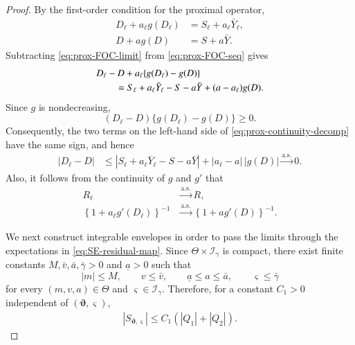\documentclass[12pt,reqno]{amsart}
\newcommand{\as}{\overset{\mathrm{a.s.}}{\longrightarrow}}
\begin{document}
{\begin{proof}
By the first-order condition for the proximal operator,
\begin{align}
D_\ell+a_\ell g(D_\ell)
&=
S_\ell+a_\ell\bar Y_\ell,
\label{eq:prox-FOC-seq}\\
D+a g(D)
&=
S+a\bar Y.
\label{eq:prox-FOC-limit}
\end{align}
Subtracting \eqref{eq:prox-FOC-limit} from
\eqref{eq:prox-FOC-seq} gives
\begin{align}
&D_\ell-D
+
a_\ell\{g(D_\ell)-g(D)\}
\notag\\
&\qquad=
S_\ell+a_\ell\bar Y_\ell
-
S-a\bar Y
+
(a-a_\ell)g(D).
\label{eq:prox-continuity-decomp}
\end{align}
Since $g$ is nondecreasing,
\[
(D_\ell-D)\{g(D_\ell)-g(D)\}\ge0.
\]
Consequently, the two terms on the left-hand side of
\eqref{eq:prox-continuity-decomp} have the same sign, and hence
\begin{align}
|D_\ell-D|
&\le
\left|
S_\ell+a_\ell\bar Y_\ell-S-a\bar Y\right|
+|a_\ell-a|\,|g(D)|
\as0.
\label{eq:prox-joint-continuity}
\end{align}
Also, it follows from the continuity of $g$ and $g'$ that
\begin{align}
R_\ell
&\as R,
\label{eq:residual-pointwise-conv}\\
\left\{
1+a_\ell g'(D_\ell)
\right\}^{-1}
&\as
\left\{
1+a g'(D)
\right\}^{-1}.
\label{eq:derivative-pointwise-conv}
\end{align}

We next construct integrable envelopes in order to pass the limits through
the expectations in \eqref{eq:SE-residual-map}. Since
$\Theta\times\mathcal I_\gamma$ is compact, there exist finite constants
$M,\bar v,\bar a,\bar\gamma>0$ and $\underline a>0$ such that
\[
|m|\le M,\qquad
v\le\bar v,\qquad
\underline a\le a\le\bar a,\qquad
\varsigma\le\bar\gamma
\]
for every
$(m,v,a)\in\Theta$ and
$\varsigma\in\mathcal I_\gamma$. Therefore, for a constant
$C_1>0$ independent of
$(\bm\vartheta,\varsigma)$,
\begin{align}
|S_{\bm\vartheta,\varsigma}|
\le
C_1(|Q_1|+|Q_2|).
\label{eq:linear-envelope}
\end{align}


\end{proof}}
\end{document}
